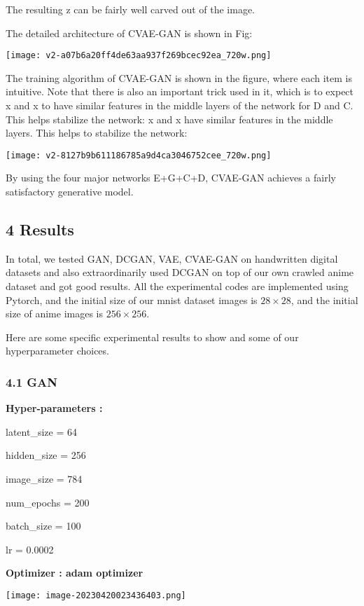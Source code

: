 \documentclass[
]{article}
\begin{document}
The resulting z can be fairly well carved out of the image.

The detailed architecture of CVAE-GAN is shown in Fig:

\texttt{[image: v2-a07b6a20ff4de63aa937f269bcec92ea\_720w.png]}

The training algorithm of CVAE-GAN is shown in the figure, where each
item is intuitive. Note that there is also an important trick used in
it, which is to expect x\textquotesingle{} and x to have similar
features in the middle layers of the network for D and C. This helps
stabilize the network: x\textquotesingle{} and x\textquotesingle{} have
similar features in the middle layers. This helps to stabilize the
network:

\texttt{[image: v2-8127b9b611186785a9d4ca3046752cee\_720w.png]}

By using the four major networks E+G+C+D, CVAE-GAN achieves a fairly
satisfactory generative model.

\hypertarget{4-results}{%
\subsection{4 Results}\label{4-results}}

In total, we tested GAN, DCGAN, VAE, CVAE-GAN on handwritten digital
datasets and also extraordinarily used DCGAN on top of our own crawled
anime dataset and got good results. All the experimental codes are
implemented using Pytorch, and the initial size of our mnist dataset
images is \(28\times28\), and the initial size of anime images is
\(256\times256\).

Here are some specific experimental results to show and some of our
hyperparameter choices.

\hypertarget{41-gan}{%
\subsubsection{4.1 GAN}\label{41-gan}}

\textbf{Hyper-parameters :}

latent\_size = 64

hidden\_size = 256

image\_size = 784

num\_epochs = 200

batch\_size = 100

lr = 0.0002

\textbf{Optimizer : adam optimizer}

\texttt{[image: image-20230420023436403.png]}
\end{document}

